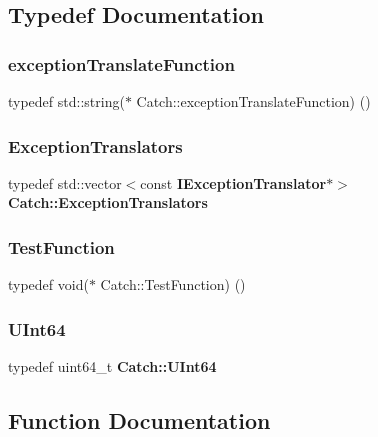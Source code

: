 \subsection{Typedef Documentation}
\mbox{\label{namespace_catch_a14edb319150d3e108bbdef994f9eec2a}} 
\subsubsection{exception\+Translate\+Function}
{\footnotesize\ttfamily typedef std\+::string($\ast$ Catch\+::exception\+Translate\+Function) ()}

\mbox{\label{namespace_catch_ae0442a3627f91437716106138b5f540b}} 
\subsubsection{Exception\+Translators}
{\footnotesize\ttfamily typedef std\+::vector$<$const \textbf{ I\+Exception\+Translator}$\ast$$>$ \textbf{ Catch\+::\+Exception\+Translators}}

\mbox{\label{namespace_catch_a26414f52d0835939fae52aadd27e6257}} 
\subsubsection{Test\+Function}
{\footnotesize\ttfamily typedef void($\ast$ Catch\+::\+Test\+Function) ()}

\mbox{\label{namespace_catch_a47aaf167582b2a30e5acd3bd874deb05}} 
\subsubsection{U\+Int64}
{\footnotesize\ttfamily typedef uint64\+\_\+t \textbf{ Catch\+::\+U\+Int64}}



\subsection{Function Documentation}
\mbox{\label{namespace_catch_ad425271249dd02956a9709e78b8b2783}} 
